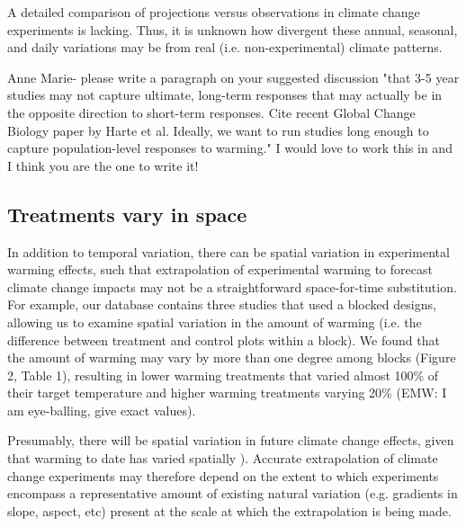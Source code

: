 \documentclass{article}
\begin{document}
\par A detailed comparison of projections versus observations in climate change experiments is lacking. Thus, it is unknown how divergent these annual, seasonal, and daily variations may be from real (i.e. non-experimental) climate patterns.  %

\par Anne Marie- please write a paragraph on your suggested discussion "that 3-5 year studies may not capture ultimate, long-term responses that may actually be in the opposite direction to short-term responses.  Cite recent Global Change Biology paper by Harte et al.  Ideally, we want to run studies long enough to capture population-level responses to warming." I would love to work this in and I think you are the one to write it!

\subsection* {Treatments vary in space}
In addition to temporal variation, there can be spatial variation in experimental warming effects, such that extrapolation of experimental warming to forecast climate change impacts may not be a straightforward space-for-time substitution. For example, our database contains three studies that used a blocked designs, allowing us to examine spatial variation in the amount of warming (i.e. the difference between treatment and control plots within a block). We found that the amount of warming may vary by more than one degree among blocks (Figure 2, Table 1), resulting in lower warming treatments that varied almost 100\% of their target temperature and higher warming treatments varying 20\% (EMW: I am eye-balling, give exact values).%

\par Presumably, there will be spatial variation in future climate change effects, given that warming to date has varied spatially \citep{ipcc2013}).  Accurate extrapolation of climate change experiments may therefore depend on the extent to which experiments encompass a representative amount of existing natural variation (e.g. gradients in slope, aspect, etc) present at the scale at which the extrapolation is being made. 
\end{document}
